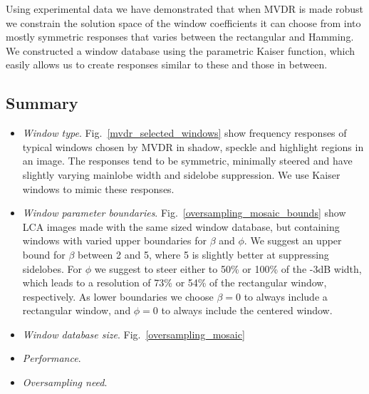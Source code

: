 \documentclass[10pt,journal,draftclsnofoot,onecolumn]{IEEEtran}
\newcommand\Fig[1]{Fig.~\ref{#1}}
\newcommand\1{\vec 1}
\begin{document}
Using experimental data we have demonstrated that when MVDR is made robust we constrain the solution space of the window coefficients it can choose from into mostly symmetric responses that varies between the rectangular and Hamming. We constructed a window database using the parametric Kaiser function, which easily allows us to create responses similar to these and those in between.

\subsection{Summary}\label{sec:summary}

\begin{itemize}
\item \emph{Window type}. \Fig{mvdr_selected_windows} show frequency responses of typical windows chosen by MVDR in shadow, speckle and highlight regions in an image. The responses tend to be symmetric, minimally steered and have slightly varying mainlobe width and sidelobe suppression. We use Kaiser windows to mimic these responses.
\item \emph{Window parameter boundaries}. \Fig{oversampling_mosaic_bounds} show LCA images made with the same sized window database, but containing windows with varied upper boundaries for $\beta$ and $\phi$. We suggest an upper bound for $\beta$ between 2 and 5, where 5 is slightly better at suppressing sidelobes. For $\phi$ we suggest to steer either to 50\% or 100\% of the -3dB width, which leads to a resolution of 73\% or 54\% of the rectangular window, respectively. As lower boundaries we choose $\beta=0$ to always include a rectangular window, and $\phi=0$ to always include the centered window.
\item \emph{Window database size}. \Fig{oversampling_mosaic}
\item \emph{Performance}.
\item \emph{Oversampling need}.
\end{itemize}

% 

% 
% 
\end{document}
